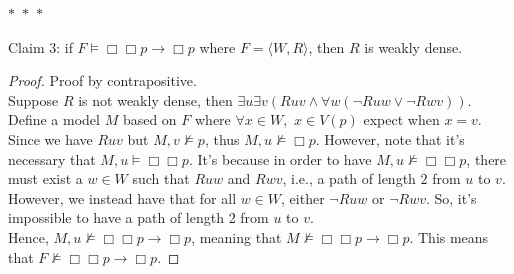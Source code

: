 \documentclass[12pt]{article}
\newcommand{\B}{\Box}
\newcommand{\s}{\vDash}
\newcommand{\ns}{\nvDash}
\begin{document}
\noindent
\begin{center}
    $\ast$~$\ast$~$\ast$
\end{center}
Claim 3: if $F \vDash \B \B p \rightarrow \B p$ where $F = \langle W, R \rangle$, then $R$ is weakly dense. 
\begin{proof} Proof by contrapositive.\\
    Suppose $R$ is not weakly dense, then $\exists u \exists v (Ruv \land \forall w(\neg Ruw \lor \neg Rwv))$.
    Define a model $M$ based on $F$ where $\forall x \in W,$ $x \in V(p)$ expect when $x = v$.\\
    Since we have $Ruv$ but $M, v \ns p$, thus $M, u \ns \B p$.
    However, note that it's necessary that $M, u \s \B \B p$.
    It's because in order to have $M, u \ns \B \B p$, there must exist a $w \in W$ such that $Ruw$ and $Rwv$, i.e., a path of length $2$ from $u$ to $v$.
    However, we instead have that for all $w \in W$, either $\neg Ruw$ or $\neg Rwv$.
    So, it's impossible to have a path of length 2 from $u$ to $v$.\\
    Hence, $M, u \ns \B \B p \to \B p$, meaning that $M \ns \B \B p \to \B p$.
    This means that $F \ns \B \B p \to \B p$.

\end{proof}
\end{document}
